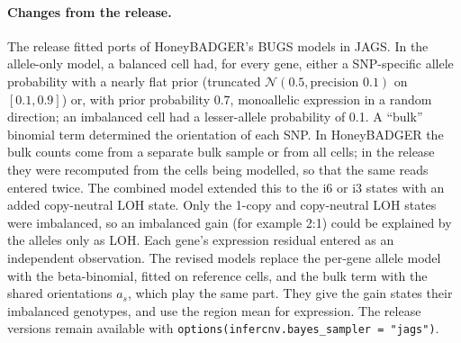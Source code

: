 \paragraph{Changes from the release.}
The release fitted ports of HoneyBADGER's BUGS models in JAGS. In the allele-only model, a balanced cell had, for every gene, either a SNP-specific allele probability with a nearly flat prior (truncated $\mathcal N(0.5, \text{precision } 0.1)$ on $[0.1, 0.9]$) or, with prior probability 0.7, monoallelic expression in a random direction; an imbalanced cell had a lesser-allele probability of 0.1. A ``bulk'' binomial term determined the orientation of each SNP. In HoneyBADGER the bulk counts come from a separate bulk sample or from all cells; in the release they were recomputed from the cells being modelled, so that the same reads entered twice. The combined model extended this to the i6 or i3 states with an added copy-neutral LOH state. Only the 1-copy and copy-neutral LOH states were imbalanced, so an imbalanced gain (for example 2:1) could be explained by the alleles only as LOH. Each gene's expression residual entered as an independent observation. The revised models replace the per-gene allele model with the beta-binomial, fitted on reference cells, and the bulk term with the shared orientations $a_s$, which play the same part. They give the gain states their imbalanced genotypes, and use the region mean for expression. The release versions remain available with \texttt{options(infercnv.bayes\_sampler = "jags")}.

